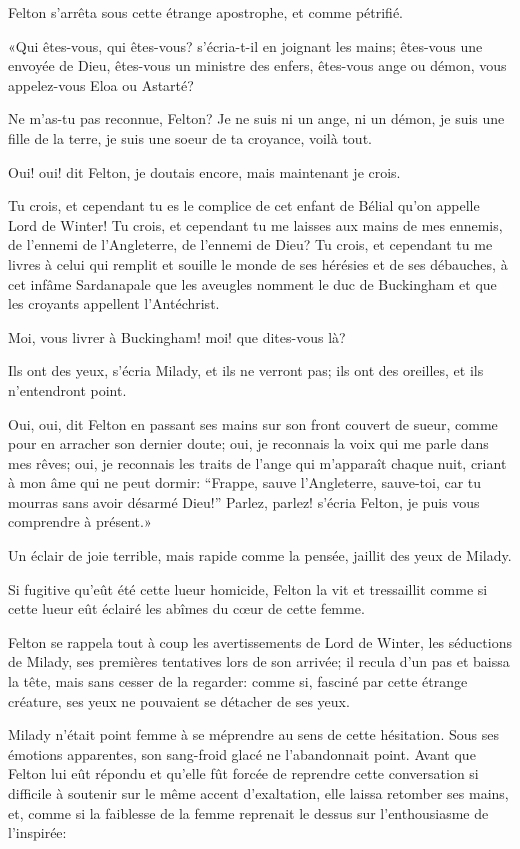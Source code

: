 Felton s'arrêta sous cette étrange apostrophe, et comme pétrifié. 

«Qui êtes-vous, qui êtes-vous? s'écria-t-il en joignant les mains; êtes-vous une envoyée de Dieu, êtes-vous un ministre des enfers, êtes-vous ange ou démon, vous appelez-vous Eloa ou Astarté? 

\speak  Ne m'as-tu pas reconnue, Felton? Je ne suis ni un ange, ni un démon, je suis une fille de la terre, je suis une soeur de ta croyance, voilà tout. 

\speak  Oui! oui! dit Felton, je doutais encore, mais maintenant je crois. 

\speak  Tu crois, et cependant tu es le complice de cet enfant de Bélial qu'on appelle Lord de Winter! Tu crois, et cependant tu me laisses aux mains de mes ennemis, de l'ennemi de l'Angleterre, de l'ennemi de Dieu? Tu crois, et cependant tu me livres à celui qui remplit et souille le monde de ses hérésies et de ses débauches, à cet infâme Sardanapale que les aveugles nomment le duc de Buckingham et que les croyants appellent l'Antéchrist. 

\speak  Moi, vous livrer à Buckingham! moi! que dites-vous là? 

\speak  Ils ont des yeux, s'écria Milady, et ils ne verront pas; ils ont des oreilles, et ils n'entendront point. 

\speak  Oui, oui, dit Felton en passant ses mains sur son front couvert de sueur, comme pour en arracher son dernier doute; oui, je reconnais la voix qui me parle dans mes rêves; oui, je reconnais les traits de l'ange qui m'apparaît chaque nuit, criant à mon âme qui ne peut dormir: “Frappe, sauve l'Angleterre, sauve-toi, car tu mourras sans avoir désarmé Dieu!” Parlez, parlez! s'écria Felton, je puis vous comprendre à présent.» 

Un éclair de joie terrible, mais rapide comme la pensée, jaillit des yeux de Milady. 

Si fugitive qu'eût été cette lueur homicide, Felton la vit et tressaillit comme si cette lueur eût éclairé les abîmes du cœur de cette femme. 

Felton se rappela tout à coup les avertissements de Lord de Winter, les séductions de Milady, ses premières tentatives lors de son arrivée; il recula d'un pas et baissa la tête, mais sans cesser de la regarder: comme si, fasciné par cette étrange créature, ses yeux ne pouvaient se détacher de ses yeux. 

Milady n'était point femme à se méprendre au sens de cette hésitation. Sous ses émotions apparentes, son sang-froid glacé ne l'abandonnait point. Avant que Felton lui eût répondu et qu'elle fût forcée de reprendre cette conversation si difficile à soutenir sur le même accent d'exaltation, elle laissa retomber ses mains, et, comme si la faiblesse de la femme reprenait le dessus sur l'enthousiasme de l'inspirée: 

